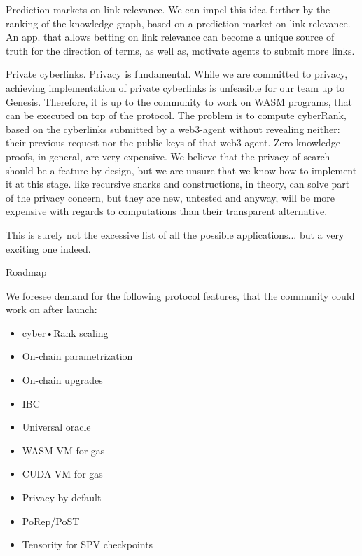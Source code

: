 \documentclass[8pt,oneside]{amsart}
\makeatletter
\newcommand{\linkgreen}[2]{\href{#1}{\color{green}{#2}}}
\renewcommand\subsection{\@startsection{subsection}
                                    {2}{\z@}
                                    {-3.25ex\@plus -1ex \@minus -.2ex}
                                    {0ex \@plus .2ex}
                                    {\play\Large}
                        }
\newcommand{\titleSection}[1]{\subsection{#1}}
\newcommand{\code}[1]{{\PlayBold #1}}
\makeatother
\begin{document}
\code{Prediction markets on link relevance}. We can impel this idea further by the ranking of the knowledge graph, based on a prediction market on link relevance. An app. that allows betting on link relevance can become a unique source of truth for the direction of terms, as well as, motivate agents to submit more links.

\code{Private cyberlinks}. Privacy is fundamental. While we are committed to privacy, achieving implementation of private cyberlinks is unfeasible for our team up to Genesis. Therefore, it is up to the community to work on WASM programs, that can be executed on top of the protocol. The problem is to compute cyberRank, based on the cyberlinks submitted by a web3-agent without revealing neither: their previous request nor the public keys of that web3-agent. Zero-knowledge proofs, in general, are very expensive. We believe that the privacy of search should be a feature by design, but we are unsure that we know how to implement it at this stage. \linkgreen{https://ipfs.io/ipfs/Qmdje3AmtsfjX9edWAxo3LFhV9CTAXoUvwGR7wHJXnc2Gk}{Coda} like recursive snarks and \linkgreen{https://ipfs.io/ipfs/Qmd99xmraYip9cVv8gRMy6Y97Bkij8qUYArGDME7CzFasg}{MimbleWimble} constructions, in theory, can solve part of the privacy concern, but they are new, untested and anyway, will be more expensive with regards to computations than their transparent alternative.

This is surely not the excessive list of all the possible applications... but a very exciting one indeed.

\titleSection{Roadmap}\label{Roadmap}

We foresee demand for the following protocol features, that the community could work on after launch:

\begin{itemize}
\item cyber•Rank scaling
\item On-chain parametrization
\item On-chain upgrades
\item IBC
\item Universal oracle
\item WASM VM for gas
\item CUDA VM for gas
\item Privacy by default
\item PoRep/PoST
\item Tensority for SPV checkpoints

\end{itemize}
\end{document}
